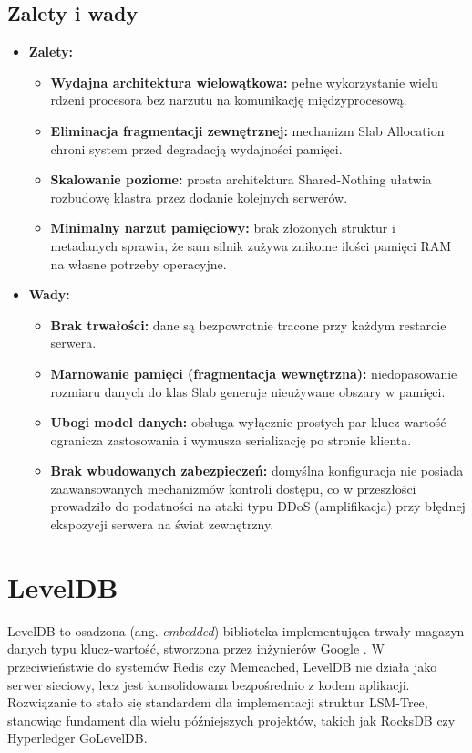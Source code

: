 \subsection{Zalety i wady}
\begin{itemize}
    \item \textbf{Zalety:}
    \begin{itemize}
        \item \textbf{Wydajna architektura wielowątkowa:} pełne wykorzystanie wielu rdzeni procesora bez narzutu na komunikację międzyprocesową.
        \item \textbf{Eliminacja fragmentacji zewnętrznej:} mechanizm Slab Allocation chroni system przed degradacją wydajności pamięci.
        \item \textbf{Skalowanie poziome:} prosta architektura Shared-Nothing ułatwia rozbudowę klastra przez dodanie kolejnych serwerów.
        \item \textbf{Minimalny narzut pamięciowy:} brak złożonych struktur i metadanych sprawia, że sam silnik zużywa znikome ilości pamięci RAM na własne potrzeby operacyjne.
    \end{itemize}
    \item \textbf{Wady:}
    \begin{itemize}
        \item \textbf{Brak trwałości:} dane są bezpowrotnie tracone przy każdym restarcie serwera.
        \item \textbf{Marnowanie pamięci (fragmentacja wewnętrzna):} niedopasowanie rozmiaru danych do klas Slab generuje nieużywane obszary w pamięci.
        \item \textbf{Ubogi model danych:} obsługa wyłącznie prostych par klucz-wartość ogranicza zastosowania i wymusza serializację po stronie klienta.
        \item \textbf{Brak wbudowanych zabezpieczeń:} domyślna konfiguracja nie posiada zaawansowanych mechanizmów kontroli dostępu, co w przeszłości prowadziło do podatności na ataki typu DDoS (amplifikacja) przy błędnej ekspozycji serwera na świat zewnętrzny.
    \end{itemize}
\end{itemize}

\section{LevelDB}
LevelDB to osadzona (ang. \emph{embedded}) biblioteka implementująca trwały magazyn danych typu klucz-wartość, stworzona przez inżynierów Google \cite{dean2011}. W przeciwieństwie do systemów Redis czy Memcached, LevelDB nie działa jako serwer sieciowy, lecz jest konsolidowana bezpośrednio z kodem aplikacji. Rozwiązanie to stało się standardem dla implementacji struktur LSM-Tree, stanowiąc fundament dla wielu późniejszych projektów, takich jak RocksDB czy Hyperledger GoLevelDB.
